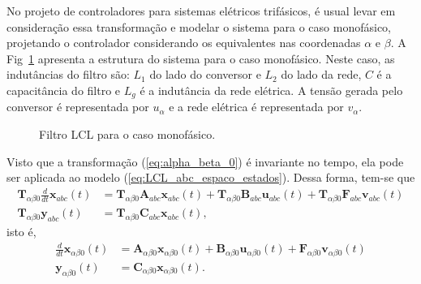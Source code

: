     No projeto de controladores para sistemas elétricos trifásicos, é usual levar em
    consideração essa transformação e modelar o sistema para o caso monofásico, projetando
    o controlador considerando os equivalentes nas coordenadas $\alpha$ e $\beta$. A
    Fig~\ref{fig:LCL_geral} apresenta a estrutura do sistema para o caso monofásico. Neste
    caso, as indutâncias do filtro são: $L_1$ do lado do conversor e $L_2$ do lado da rede,
    $C$ é a capacitância do filtro e $L_g$ é a indutância da rede elétrica. A tensão gerada
    pelo conversor é representada por $u_{\alpha}$ e a rede elétrica é representada por
    $v_{\alpha}$.

    \begin{figure}[htb]
        \centering{
            \def\svgwidth{\textwidth}
            }
        \renewcommand\figurename{Fig.}
        \caption{Filtro LCL para o caso monofásico.}
        \label{fig:LCL_geral}
    \end{figure}

    Visto que a transformação (\ref{eq:alpha_beta_0}) é invariante no tempo, ela pode ser
    aplicada ao modelo (\ref{eq:LCL_abc_espaco_estados}). Dessa forma, tem-se que
    \begin{equation}
        \begin{split}
            \mathbf{T}_{\alpha \beta 0} \frac{d}{dt} \mathbf{x}_{abc}(t) & =
                \mathbf{T}_{\alpha \beta 0} \mathbf{A}_{abc} \mathbf{x}_{abc}(t) +
                \mathbf{T}_{\alpha \beta 0} \mathbf{B}_{abc} \mathbf{u}_{abc}(t) +
                \mathbf{T}_{\alpha \beta 0} \mathbf{F}_{abc} \mathbf{v}_{abc}(t) \\
            \mathbf{T}_{\alpha \beta 0} \mathbf{y}_{abc}(t) & = \mathbf{T}_{\alpha \beta 0}
                \mathbf{C}_{abc} \mathbf{x}_{abc}(t) \text{,}
        \end{split}
    \end{equation}
    isto é,
    \begin{equation}
        \begin{split}
            \frac{d}{dt} \mathbf{x}_{\alpha \beta 0}(t) & =
                \mathbf{A}_{\alpha \beta 0} \mathbf{x}_{\alpha \beta 0}(t) +
                \mathbf{B}_{\alpha \beta 0} \mathbf{u}_{\alpha \beta 0}(t) +
                \mathbf{F}_{\alpha \beta 0} \mathbf{v}_{\alpha \beta 0}(t) \\
            \mathbf{y}_{\alpha \beta 0}(t) & = \mathbf{C}_{\alpha \beta 0}
                \mathbf{x}_{\alpha \beta 0}(t) \text{.}
        \end{split}
        \label{eq:LCL_ab0_espaco_estados}
    \end{equation}

